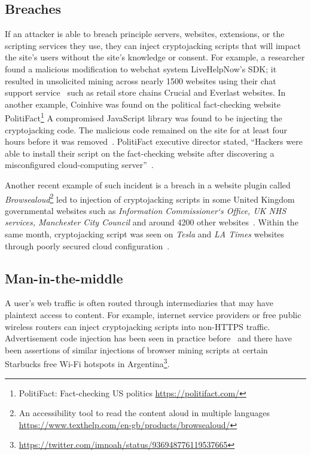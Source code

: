 \subsection{Breaches} 

If an attacker is able to breach principle servers, websites, extensions, or the scripting services they use, they can inject cryptojacking scripts that will impact the site's users without the site's knowledge or consent. For example, a researcher found a malicious modification to webchat system LiveHelpNow's SDK; it resulted in unsolicited mining across nearly 1500 websites using their chat support service~\cite{chatsupporthack} such as retail store chains Crucial and Everlast websites. In another example, Coinhive was found on the political fact-checking website PolitiFact\footnote{PolitiFact: Fact-checking US politics \url{https://politifact.com/}} A compromised JavaScript library was found to be injecting the cryptojacking code. The malicious code remained on the site for at least four hours before it was removed~\cite{politifactcoinhive}. PolitiFact executive director stated, ``Hackers were able to install their script on the fact-checking website after discovering a misconfigured cloud-computing server''~\cite{politifactcoinhivewsj}. 

Another recent example of such incident is a breach in a website plugin called \textit{Browsealoud}\footnote{An accessibility tool to read the content aloud in multiple languages \url{https://www.texthelp.com/en-gb/products/browsealoud/}} led to injection of cryptojacking scripts in some United Kingdom governmental websites such as \textit{Information Commissioner`s Office, UK NHS services, Manchester City Council} and around 4200 other websites~\cite{theregisterukgovern}. Within the same month, cryptojacking script was seen on \textit{Tesla} and \textit{LA Times} websites through poorly secured cloud configuration~\cite{nakedsecurityLatimes}.

\subsection{Man-in-the-middle} 

A user's web traffic is often routed through intermediaries that may have plaintext access to content. For example, internet service providers or free public wireless routers can inject cryptojacking scripts into non-HTTPS traffic. Advertisement code injection has been seen in practice before~\cite{vergeadinjection} and there have been assertions of similar injections of browser mining scripts at certain Starbucks free Wi-Fi hotspots in Argentina\footnote{\url{https://twitter.com/imnoah/status/936948776119537665}}.




